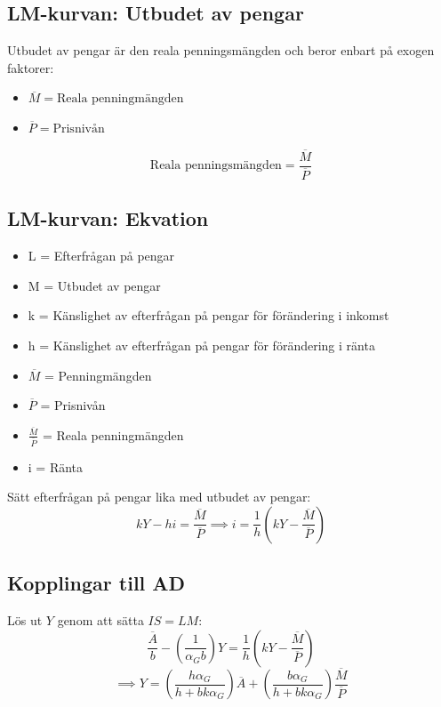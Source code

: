 \documentclass[12pt,a4paper]{article}
\begin{document}
\subsection*{LM-kurvan: Utbudet av pengar}
Utbudet av pengar är den reala penningsmängden och beror enbart på exogen faktorer:
\begin{itemize}
    \item $\overline{M} = \text{Reala penningmängden}$
    \item $\overline{P} = \text{Prisnivån}$
\end{itemize}

$$\text{Reala penningsmängden} = \frac{\overline{M}}{\overline{P}}$$

\subsection*{LM-kurvan: Ekvation}
\begin{itemize}
    \item L = Efterfrågan på pengar
    \item M = Utbudet av pengar
    \item k = Känslighet av efterfrågan på pengar för förändering i inkomst
    \item h = Känslighet av efterfrågan på pengar för förändering i ränta
    \item $\overline{M}$ = Penningmängden
    \item $\overline{P}$ = Prisnivån
    \item $\frac{\overline{M}}{\overline{P}}$ = Reala penningmängden
    \item i = Ränta
\end{itemize}
Sätt efterfrågan på pengar lika med utbudet av pengar:
$$kY - hi = \frac{\overline{M}}{\overline{P}} \implies i = \frac{1}{h}(kY - \frac{\overline{M}}{\overline{P}})$$

\subsection*{Kopplingar till AD}
Lös ut $Y$ genom att sätta $IS = LM$:
$$\frac{\overline{A}}{b} - (\frac{1}{\alpha_G b})Y = \frac{1}{h}(kY - \frac{\overline{M}}{\overline{P}})$$
$$\implies Y = (\frac{h \alpha_G}{h + bk\alpha_G})\overline{A} + (\frac{b \alpha_G}{h + bk\alpha_G})\frac{\overline{M}}{\overline{P}}$$
\end{document}
